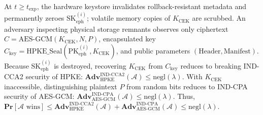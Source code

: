 \begin{IEEEproof}
At $t \ge t_{\text{exp}}$, the hardware keystore invalidates rollback-resistant metadata and permanently zeroes $\text{SK}_{\text{eph}}^{(i)}$; volatile memory copies of $K_{\text{CEK}}$ are scrubbed. An adversary inspecting physical storage remnants observes only ciphertext $C = \text{AES-GCM}(K_{\text{CEK}}, N, P)$, encapsulated key $C_{\text{key}} = \text{HPKE\_Seal}(\text{PK}_{\text{eph}}^{(i)}, K_{\text{CEK}})$, and public parameters $(\text{Header}, \text{Manifest})$. Because $\text{SK}_{\text{eph}}^{(i)}$ is destroyed, recovering $K_{\text{CEK}}$ from $C_{\text{key}}$ reduces to breaking IND-CCA2 security of HPKE: $\mathbf{Adv}^{\text{IND-CCA2}}_{\text{HPKE}}(\mathcal{A}) \le \text{negl}(\lambda)$. With $K_{\text{CEK}}$ inaccessible, distinguishing plaintext $P$ from random bits reduces to IND-CPA security of AES-GCM: $\mathbf{Adv}^{\text{IND-CPA}}_{\text{AES-GCM}}(\mathcal{A}) \le \text{negl}(\lambda)$. Thus, $\mathbf{Pr}[\mathcal{A} \text{ wins}] \le \mathbf{Adv}^{\text{IND-CCA2}}_{\text{HPKE}}(\mathcal{A}) + \mathbf{Adv}^{\text{IND-CPA}}_{\text{AES-GCM}}(\mathcal{A}) \le \text{negl}(\lambda)$.
\end{IEEEproof}
